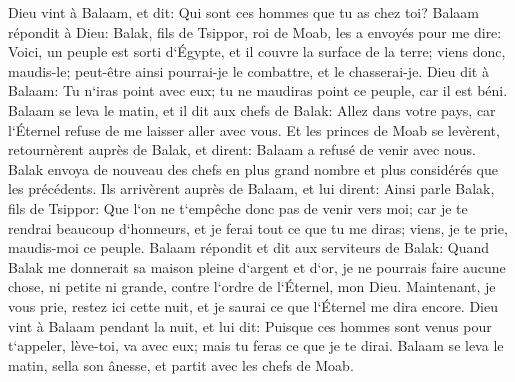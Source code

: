 \verse Dieu vint à Balaam, et dit: Qui sont ces hommes que tu as chez toi? 
\verse Balaam répondit à Dieu: Balak, fils de Tsippor, roi de Moab, les a envoyés pour me dire: 
\verse Voici, un peuple est sorti d`Égypte, et il couvre la surface de la terre; viens donc, maudis-le; peut-être ainsi pourrai-je le combattre, et le chasserai-je. 
\verse Dieu dit à Balaam: Tu n`iras point avec eux; tu ne maudiras point ce peuple, car il est béni. 
\verse Balaam se leva le matin, et il dit aux chefs de Balak: Allez dans votre pays, car l`Éternel refuse de me laisser aller avec vous. 
\verse Et les princes de Moab se levèrent, retournèrent auprès de Balak, et dirent: Balaam a refusé de venir avec nous. 
\verse Balak envoya de nouveau des chefs en plus grand nombre et plus considérés que les précédents. 
\verse Ils arrivèrent auprès de Balaam, et lui dirent: Ainsi parle Balak, fils de Tsippor: Que l`on ne t`empêche donc pas de venir vers moi; 
\verse car je te rendrai beaucoup d`honneurs, et je ferai tout ce que tu me diras; viens, je te prie, maudis-moi ce peuple. 
\verse Balaam répondit et dit aux serviteurs de Balak: Quand Balak me donnerait sa maison pleine d`argent et d`or, je ne pourrais faire aucune chose, ni petite ni grande, contre l`ordre de l`Éternel, mon Dieu. 
\verse Maintenant, je vous prie, restez ici cette nuit, et je saurai ce que l`Éternel me dira encore. 
\verse Dieu vint à Balaam pendant la nuit, et lui dit: Puisque ces hommes sont venus pour t`appeler, lève-toi, va avec eux; mais tu feras ce que je te dirai. 
\verse Balaam se leva le matin, sella son ânesse, et partit avec les chefs de Moab. 

